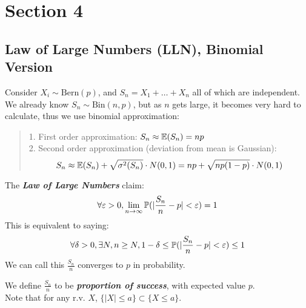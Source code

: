 \section{Section 4}
\subsection{Law of Large Numbers (LLN), Binomial Version}
Consider $X_i \sim \text{Bern}(p)$, and $S_n = X_1 + \dots + X_n$ all of which are independent. We already know $S_n \sim \text{Bin}(n, p)$, but as $n$ gets large, it becomes very hard to calculate, thus we use binomial approximation:
\begin{quote}
    1. First order approximation: $S_n \approx \mathbb{E}(S_n) = np$ \\
    2. Second order approximation (deviation from mean is Gaussian):
    $$S_n \approx \mathbb{E}(S_n) + \sqrt{\sigma^2(S_n)}\cdot N(0, 1) = np + \sqrt{np(1-p)} \cdot N(0, 1)$$
\end{quote}
\begin{theorem}
    The \textbf{\textit{Law of Large Numbers}} claim:
    $$\forall \varepsilon > 0, \lim_{n \to \infty} \mathbb{P}(|\frac{S_n}{n} - p| < \varepsilon) = 1$$
    This is equivalent to saying:
    $$\forall \delta > 0, \exists N, n \ge N, 1 - \delta \le \mathbb{P}(|\frac{S_n}{n} - p| < \varepsilon) \le 1$$
    We can call this $\frac{S_n}{n}$ converges to $p$ in probability.
\end{theorem}
We define $\frac{S_n}{n}$ to be \textbf{\textit{proportion of success}}, with expected value $p$. \\
Note that for any r.v. $X$, $\{|X| \le a\} \subset \{X \le a\}$.

